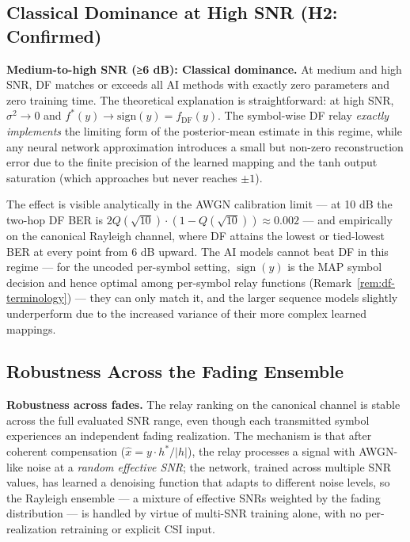 \subsection{Classical Dominance at High SNR (H2: Confirmed)}\label{sec:classical-dominance-at-high-snr-h2-confirmed}

\textbf{Medium-to-high SNR (≥6 dB): Classical dominance.} At medium and high SNR, DF matches or exceeds all AI methods with exactly zero parameters and zero training time. The theoretical explanation is straightforward: at high SNR, \(\sigma^2 \to 0\) and \(f^*(y) \to \text{sign}(y) = f_{\text{DF}}(y)\). The symbol-wise DF relay \emph{exactly implements} the limiting form of the posterior-mean estimate in this regime, while any neural network approximation introduces a small but non-zero reconstruction error due to the finite precision of the learned mapping and the tanh output saturation (which approaches but never reaches \(\pm 1\)).

The effect is visible analytically in the AWGN calibration limit --- at 10 dB the two-hop DF BER is \(2Q(\sqrt{10}) \cdot (1 - Q(\sqrt{10})) \approx 0.002\) --- and empirically on the canonical Rayleigh channel, where DF attains the lowest or tied-lowest BER at every point from 6 dB upward. The AI models cannot beat DF in this regime --- for the uncoded per-symbol setting, $\operatorname{sign}(y)$ is the MAP symbol decision and hence optimal among per-symbol relay functions (Remark~\ref{rem:df-terminology}) --- they can only match it, and the larger sequence models slightly underperform due to the increased variance of their more complex learned mappings.

\subsection{Robustness Across the Fading Ensemble}\label{sec:channel-robustness}

\textbf{Robustness across fades.} The relay ranking on the canonical channel is stable across the full evaluated SNR range, even though each transmitted symbol experiences an independent fading realization. The mechanism is that after coherent compensation (\(\hat{x} = y \cdot h^*/|h|\)), the relay processes a signal with AWGN-like noise at a \emph{random effective SNR}; the network, trained across multiple SNR values, has learned a denoising function that adapts to different noise levels, so the Rayleigh ensemble --- a mixture of effective SNRs weighted by the fading distribution --- is handled by virtue of multi-SNR training alone, with no per-realization retraining or explicit CSI input.


